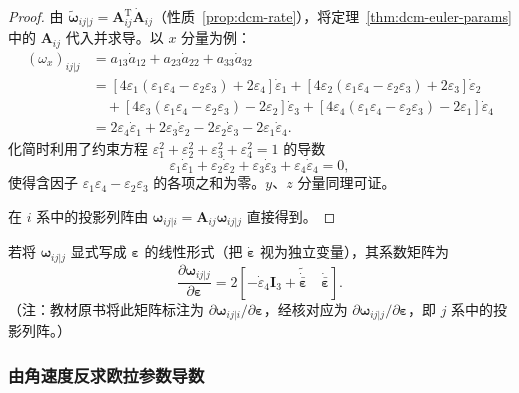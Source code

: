 \begin{proof}
	由 $\tilde{\boldsymbol{\omega}}_{ij|j}=\boldsymbol{A}_{ij}^{\mathrm{T}}\dot{\boldsymbol{A}}_{ij}$（性质~\ref{prop:dcm-rate}），将定理~\ref{thm:dcm-euler-params} 中的 $\boldsymbol{A}_{ij}$ 代入并求导。以 $x$ 分量为例：
	$$
	\begin{aligned}
		(\omega_x)_{ij|j}
		&=a_{13}\dot{a}_{12}+a_{23}\dot{a}_{22}+a_{33}\dot{a}_{32}\\
		&= \left[4\varepsilon_1(\varepsilon_1\varepsilon_4-\varepsilon_2\varepsilon_3)+2\varepsilon_4\right]\dot{\varepsilon}_1
		+ \left[4\varepsilon_2(\varepsilon_1\varepsilon_4-\varepsilon_2\varepsilon_3)+2\varepsilon_3\right]\dot{\varepsilon}_2\\
		&\quad + \left[4\varepsilon_3(\varepsilon_1\varepsilon_4-\varepsilon_2\varepsilon_3)-2\varepsilon_2\right]\dot{\varepsilon}_3
		+ \left[4\varepsilon_4(\varepsilon_1\varepsilon_4-\varepsilon_2\varepsilon_3)-2\varepsilon_1\right]\dot{\varepsilon}_4\\
		&= 2\varepsilon_4\dot{\varepsilon}_1+2\varepsilon_3\dot{\varepsilon}_2-2\varepsilon_2\dot{\varepsilon}_3-2\varepsilon_1\dot{\varepsilon}_4.
	\end{aligned}
	$$
	化简时利用了约束方程 $\varepsilon_1^2+\varepsilon_2^2+\varepsilon_3^2+\varepsilon_4^2=1$ 的导数
	$$
	\varepsilon_1\dot{\varepsilon}_1+\varepsilon_2\dot{\varepsilon}_2+\varepsilon_3\dot{\varepsilon}_3+\varepsilon_4\dot{\varepsilon}_4=0,
	$$
	使得含因子 $\varepsilon_1\varepsilon_4-\varepsilon_2\varepsilon_3$ 的各项之和为零。$y$、$z$ 分量同理可证。

	在 $i$ 系中的投影列阵由 $\boldsymbol{\omega}_{ij|i}=\boldsymbol{A}_{ij}\boldsymbol{\omega}_{ij|j}$ 直接得到。
\end{proof}

\begin{remark}
	若将 $\boldsymbol{\omega}_{ij|j}$ 显式写成 $\boldsymbol{\varepsilon}$ 的线性形式（把 $\dot{\boldsymbol{\varepsilon}}$ 视为独立变量），其系数矩阵为
	$$
	\frac{\partial\boldsymbol{\omega}_{ij|j}}{\partial\boldsymbol{\varepsilon}}
	=2\left[-\dot{\varepsilon}_4\boldsymbol{I}_3+\tilde{\dot{\bar{\boldsymbol{\varepsilon}}}}\quad \dot{\bar{\boldsymbol{\varepsilon}}}\right].
	$$
	（注：教材原书将此矩阵标注为 $\partial\boldsymbol{\omega}_{ij|i}/\partial\boldsymbol{\varepsilon}$，经核对应为 $\partial\boldsymbol{\omega}_{ij|j}/\partial\boldsymbol{\varepsilon}$，即 $j$ 系中的投影列阵。）
\end{remark}

\subsubsection{由角速度反求欧拉参数导数}

